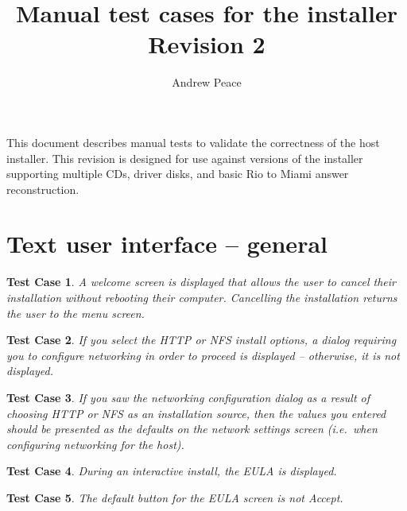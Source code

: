 \documentclass[a4paper]{article}
\newtheorem{testcase}{Test Case}
\begin{document}
\title{Manual test cases for the installer \\  Revision 2}
\author{Andrew Peace}
\date{}

\maketitle

This document describes manual tests to validate the correctness of
the host installer.  This revision is designed for use against
versions of the installer supporting multiple CDs, driver disks, and
basic Rio to Miami answer reconstruction.

\section{Text user interface -- general}

\begin{testcase}
A welcome screen is displayed that allows the user to cancel their
installation without rebooting their computer.  Cancelling the
installation returns the user to the menu screen.
\end{testcase}

\begin{testcase}
If you select the HTTP or NFS install options, a dialog requiring you
to configure networking in order to proceed is displayed -- otherwise,
it is not displayed.
\end{testcase}

\begin{testcase}
If you saw the networking configuration dialog as a result of choosing
HTTP or NFS as an installation source, then the values you entered should
be presented as the defaults on the network settings screen
(i.e.\ when configuring networking for the host).
\end{testcase}

\begin{testcase}
During an interactive install, the EULA is displayed.
\end{testcase}

\begin{testcase}
The default button for the EULA screen is not Accept.
\end{testcase}
\end{document}
